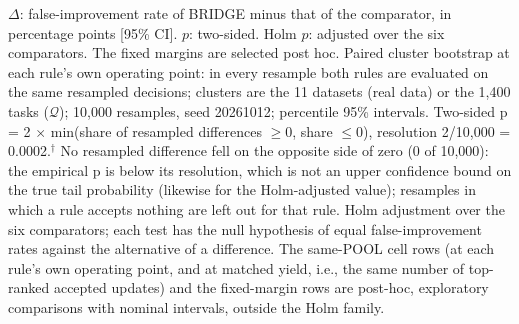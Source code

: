 \begin{table}[!htb]
\vspace{2pt}
\parbox{\linewidth}{\justifying\scriptsize *$\Delta$: false-improvement rate of BRIDGE minus that of the comparator, in percentage points [95\% CI]. $p$: two-sided. Holm $p$: adjusted over the six comparators. The fixed margins are selected post hoc. Paired cluster bootstrap at each rule's own operating point: in every resample both rules are evaluated on the same resampled decisions; clusters are the 11 datasets (real data) or the 1,400 tasks ($\mathcal{Q}$); 10,000 resamples, seed 20261012; percentile 95\% intervals. Two-sided p = 2 $\times$ min(share of resampled differences $\geq 0$, share $\leq 0$), resolution 2/10,000 = 0.0002.$^{\dagger}$ No resampled difference fell on the opposite side of zero (0 of 10,000): the empirical p is below its resolution, which is not an upper confidence bound on the true tail probability (likewise for the Holm-adjusted value); resamples in which a rule accepts nothing are left out for that rule. Holm adjustment over the six comparators; each test has the null hypothesis of equal false-improvement rates against the alternative of a difference. The same-POOL cell rows (at each rule's own operating point, and at matched yield, i.e., the same number of top-ranked accepted updates) and the fixed-margin rows are post-hoc, exploratory comparisons with nominal intervals, outside the Holm family.}
\end{table}
